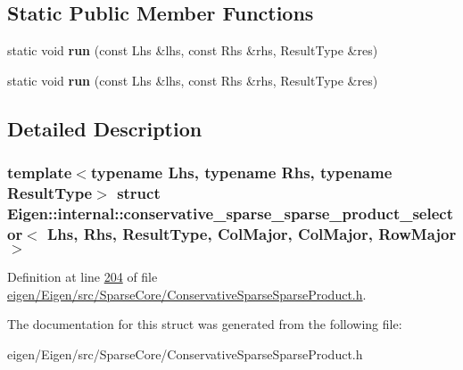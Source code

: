 \subsection*{Static Public Member Functions}
\begin{DoxyCompactItemize}
\item 
\mbox{\label{struct_eigen_1_1internal_1_1conservative__sparse__sparse__product__selector_3_01_lhs_00_01_rhs_0f1680f6d2d45917adac59b754c8465e6_aee14dcc69459334713705c5691bcfab4}} 
static void {\bfseries run} (const Lhs \&lhs, const Rhs \&rhs, Result\+Type \&res)
\item 
\mbox{\label{struct_eigen_1_1internal_1_1conservative__sparse__sparse__product__selector_3_01_lhs_00_01_rhs_0f1680f6d2d45917adac59b754c8465e6_aee14dcc69459334713705c5691bcfab4}} 
static void {\bfseries run} (const Lhs \&lhs, const Rhs \&rhs, Result\+Type \&res)
\end{DoxyCompactItemize}


\subsection{Detailed Description}
\subsubsection*{template$<$typename Lhs, typename Rhs, typename Result\+Type$>$\newline
struct Eigen\+::internal\+::conservative\+\_\+sparse\+\_\+sparse\+\_\+product\+\_\+selector$<$ Lhs, Rhs, Result\+Type, Col\+Major, Col\+Major, Row\+Major $>$}



Definition at line \hyperlink{eigen_2_eigen_2src_2_sparse_core_2_conservative_sparse_sparse_product_8h_source_l00204}{204} of file \hyperlink{eigen_2_eigen_2src_2_sparse_core_2_conservative_sparse_sparse_product_8h_source}{eigen/\+Eigen/src/\+Sparse\+Core/\+Conservative\+Sparse\+Sparse\+Product.\+h}.



The documentation for this struct was generated from the following file\+:\begin{DoxyCompactItemize}
\item 
eigen/\+Eigen/src/\+Sparse\+Core/\+Conservative\+Sparse\+Sparse\+Product.\+h\end{DoxyCompactItemize}
